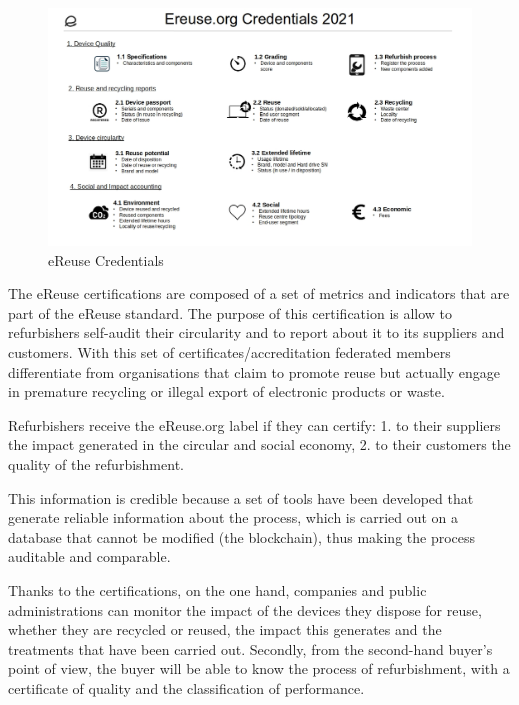 \documentclass[
]{book}
\begin{document}
\begin{figure}

{\centering \includegraphics[width=1\linewidth]{./figs/4} 

}

\caption{eReuse Credentials}\label{fig:figreusecredentials}
\end{figure}

The eReuse certifications are composed of a set of metrics and indicators that are part of the eReuse standard. The purpose of this certification is allow to refurbishers self-audit their circularity and to report about it to its suppliers and customers. With this set of certificates/accreditation federated members differentiate from organisations that claim to promote reuse but actually engage in premature recycling or illegal export of electronic products or waste.

Refurbishers receive the eReuse.org label if they can certify: 1. to their suppliers the impact generated in the circular and social economy, 2. to their customers the quality of the refurbishment.

This information is credible because a set of tools have been developed that generate reliable information about the process, which is carried out on a database that cannot be modified (the blockchain), thus making the process auditable and comparable.

Thanks to the certifications, on the one hand, companies and public administrations can monitor the impact of the devices they dispose for reuse, whether they are recycled or reused, the impact this generates and the treatments that have been carried out. Secondly, from the second-hand buyer's point of view, the buyer will be able to know the process of refurbishment, with a certificate of quality and the classification of performance.
\end{document}
